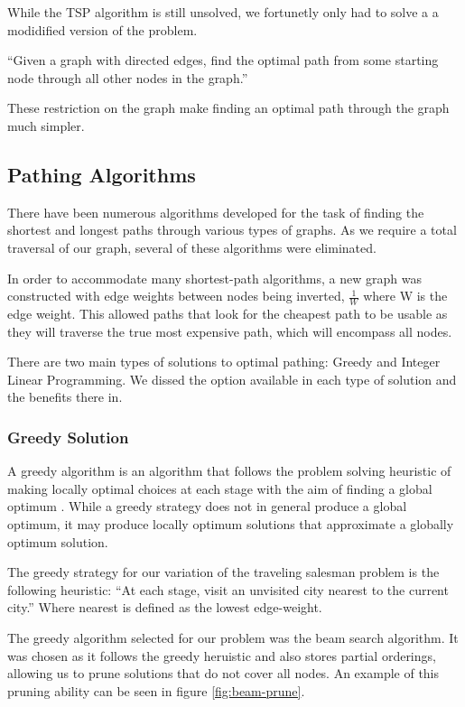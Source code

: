\documentclass[bsc,frontabs,twoside,singlespacing,parskip,deptreport]{infthesis}     %
\begin{document}
While the TSP algorithm is still unsolved, we fortunetly only had to solve a a modidified version of the problem.\\

\begin{center}
  \enquote{Given a graph with directed edges, find the optimal path from some starting node through all other nodes in
  the graph.}
\end{center}

These restriction on the graph make finding an optimal path through the graph much simpler.


\subsection{Pathing Algorithms}
There have been numerous algorithms developed for the task of finding the shortest and longest paths through various types of graphs.
As we require a total traversal of our graph, several of these algorithms were eliminated.

In order to accommodate many shortest-path algorithms, a new graph was constructed with edge weights between nodes being inverted,
$\frac{1}{W}$ where W is the edge weight. This allowed paths that look for the cheapest path to be usable as they will traverse the
true most expensive path, which will encompass all nodes.

There are two main types of solutions to optimal pathing: Greedy and Integer Linear Programming.
We dissed the option available in each type of solution and the benefits there in.

\subsubsection{Greedy Solution}
A greedy algorithm is an algorithm that follows the problem solving heuristic of making locally optimal choices at each stage with the aim
of finding a global optimum \cite{black2004dictionary}.
While a greedy strategy does not in general produce a global optimum, it may produce locally optimum solutions that approximate a globally optimum solution.


The greedy strategy for our variation of the traveling salesman problem is the following heuristic:
``At each stage, visit an unvisited city nearest to the current city.''
Where nearest is defined as the lowest edge-weight.


The greedy algorithm selected for our problem was the beam search algorithm.
It was chosen as it follows the greedy heruistic and also stores partial orderings, allowing us to prune solutions that do not cover all nodes.
An example of this pruning ability can be seen in figure \ref{fig:beam-prune}.
\end{document}
